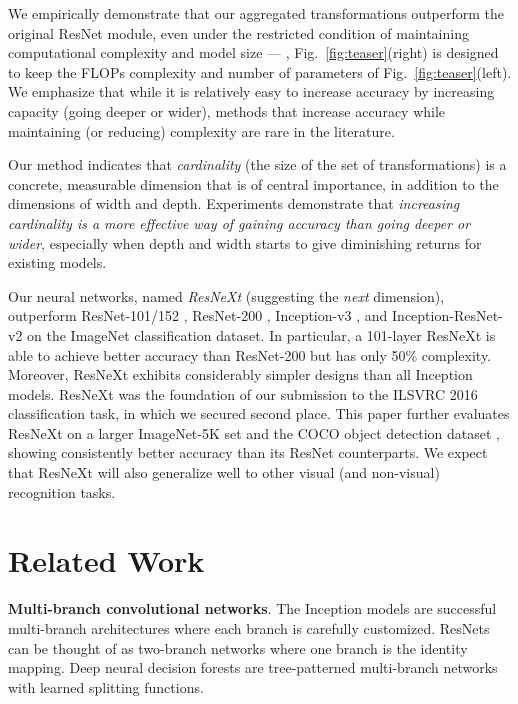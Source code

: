 \documentclass[10pt,twocolumn,letterpaper]{article}
\begin{document}
We empirically demonstrate that our aggregated transformations outperform the original ResNet module, even under the restricted condition of maintaining computational complexity and model size --- \eg, Fig.~\ref{fig:teaser}(right) is designed to keep the FLOPs complexity and number of parameters of Fig.~\ref{fig:teaser}(left).
We emphasize that while it is relatively easy to increase accuracy by increasing capacity (going deeper or wider), methods that increase accuracy while maintaining (or reducing) complexity are rare in the literature.

Our method indicates that \emph{cardinality} (the size of the set of transformations) is a concrete, measurable dimension that is of central importance, in addition to the dimensions of width and depth.
Experiments demonstrate that \emph{increasing cardinality is a more effective way of gaining accuracy than going deeper or wider}, especially when depth and width starts to give diminishing returns for existing models.

Our neural networks, named \emph{ResNeXt} (suggesting the \emph{next} dimension), outperform ResNet-101/152 \cite{He2016}, ResNet-200 \cite{He2016a}, Inception-v3 \cite{Szegedy2016a}, and Inception-ResNet-v2 \cite{Szegedy2016} on the ImageNet classification dataset. 
In particular, a 101-layer ResNeXt is able to achieve better accuracy than ResNet-200 \cite{He2016a} but has only 50\% complexity. Moreover, ResNeXt exhibits considerably simpler designs than all Inception models. 
ResNeXt was the foundation of our submission to the ILSVRC 2016 classification task, in which we secured second place.
This paper further evaluates ResNeXt on a larger ImageNet-5K set and the COCO object detection dataset \cite{Lin2014}, showing consistently better accuracy than its ResNet counterparts.
We expect that ResNeXt will also generalize well to other visual (and non-visual) recognition tasks.

\section{Related Work}

\noindent\textbf{Multi-branch convolutional networks}. The Inception models \cite{Szegedy2015,Ioffe2015,Szegedy2016a,Szegedy2016} are successful multi-branch architectures where each branch is carefully customized.
ResNets \cite{He2016} can be thought of as two-branch networks where one branch is the identity mapping.
Deep neural decision forests \cite{Kontschieder2015} are tree-patterned multi-branch networks with learned splitting functions.
\end{document}
